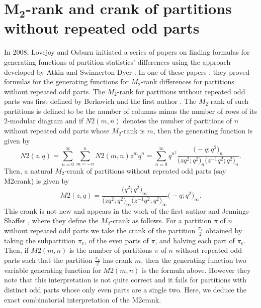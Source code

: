 \documentclass[10pt,a4paper]{amsart}
\numberwithin{equation}{section}
\begin{document}
\section[M\_2-rank and crank of partitions without repeated odd parts]{$\boldsymbol{M_2}$-rank and crank of partitions without repeated odd parts}\label{section4}

In 2008, Lovejoy and Osburn initiated a series of papers on finding formulas for generating functions of partition statistics' differences using the approach developed by Atkin and Swinnerton-Dyer \cite{At-Sw}. In one of these papers \cite{Lo-Os09}, they proved formulas for the generating functions for $M_2$-rank differences for partitions without repeated odd parts. The $M_2$-rank for partitions without repeated odd parts was first defined by Berkovich and the first author \cite{Be-Ga}. The $M_2$-rank of such partitions is defined to be the number of columns minus the number of rows of its $2$-modular diagram and if $N2(m, n)$ denotes the number of partitions of $n$ without repeated odd parts whose $M_2$-rank is $m$, then the generating function is given by \cite[equation~(1.1)]{Lo-Os09}
\begin{equation*}
N2(z,q) = \sum_{n=0}^\infty
\sum_{m=-n}^n N2(m,n) z^m q^n=\sum\limits_{n=0}^{\infty}q^{n^2}\dfrac{\bigl(-q;q^2\bigr)_{n}}{\bigl(zq^2;q^2\bigr)_{n}\bigl(z^{-1}q^2;q^2\bigr)_{n}}.
\end{equation*}
Then, a natural $M_2$-crank of partitions without repeated odd parts (say M2crank) is given by
\begin{equation*}
M2(z,q) = \dfrac{\bigl(q^2;q^2\bigr)_{\infty}}{\bigl(zq^2;q^2\bigr)_{\infty}\bigl(z^{-1}q^2;q^2\bigr)_{\infty}}\bigl(-q;q^2\bigr)_{\infty}.
\end{equation*}
This crank is not new and appears in the work of the first author and Jennings-Shaffer \cite{Ga-Sh}, where they define the $M_2$-crank as follows. For a partition $\pi$ of $n$ without repeated odd parts
we take the crank of the partition $\frac{\pi_e}{2}$ obtained
by taking the subpartition $\pi_e$, of the even parts of $\pi$,
and halving each part of $\pi_e$. Then, if $M2(m,n)$ is the number
of partitions $\pi$ of $n$ without repeated odd parts such that the
partition $\frac{\pi_e}{2}$ has crank $m$, then the generating
function two variable generating function for $M2(m,n)$ is the
formula above. However they note that this interpretation is not quite correct and it fails for partitions with distinct odd parts whose only even parts are a single two. Here, we deduce the exact combinatorial interpretation of the M2crank.
\end{document}
